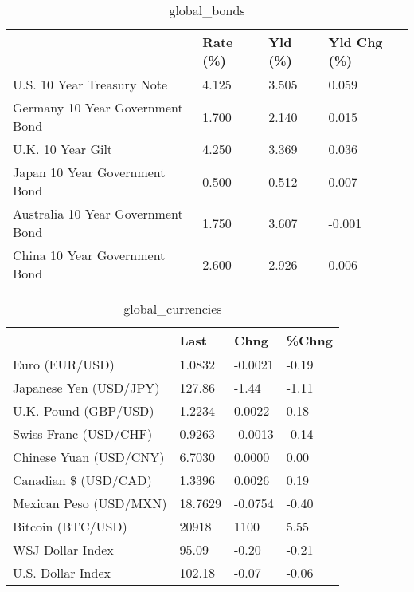 \documentclass{article}%
\begin{document}
%


\begin{table}[htbp]%
\caption{global\_bonds}%
\centering%
\begin{adjustbox}{width=1\textwidth}%
\begin{tabular}{llll}
\toprule
                                  & Rate (\%) & Yld (\%) & Yld Chg (\%) \\
\midrule
       U.S. 10 Year Treasury Note &    4.125 &   3.505 &       0.059 \\
  Germany 10 Year Government Bond &    1.700 &   2.140 &       0.015 \\
                U.K. 10 Year Gilt &    4.250 &   3.369 &       0.036 \\
    Japan 10 Year Government Bond &    0.500 &   0.512 &       0.007 \\
Australia 10 Year Government Bond &    1.750 &   3.607 &      -0.001 \\
    China 10 Year Government Bond &    2.600 &   2.926 &       0.006 \\
\bottomrule
\end{tabular}
%
\end{adjustbox}%
\end{table}

%


\begin{table}[htbp]%
\caption{global\_currencies}%
\centering%
\begin{adjustbox}{width=1\textwidth}%
\begin{tabular}{llll}
\toprule
                       &    Last &    Chng & \%Chng \\
\midrule
        Euro (EUR/USD) &  1.0832 & -0.0021 & -0.19 \\
Japanese Yen (USD/JPY) &  127.86 &   -1.44 & -1.11 \\
  U.K. Pound (GBP/USD) &  1.2234 &  0.0022 &  0.18 \\
 Swiss Franc (USD/CHF) &  0.9263 & -0.0013 & -0.14 \\
Chinese Yuan (USD/CNY) &  6.7030 &  0.0000 &  0.00 \\
  Canadian \$ (USD/CAD) &  1.3396 &  0.0026 &  0.19 \\
Mexican Peso (USD/MXN) & 18.7629 & -0.0754 & -0.40 \\
     Bitcoin (BTC/USD) &   20918 &    1100 &  5.55 \\
      WSJ Dollar Index &   95.09 &   -0.20 & -0.21 \\
     U.S. Dollar Index &  102.18 &   -0.07 & -0.06 \\
\bottomrule
\end{tabular}
%
\end{adjustbox}%
\end{table}
\end{document}

